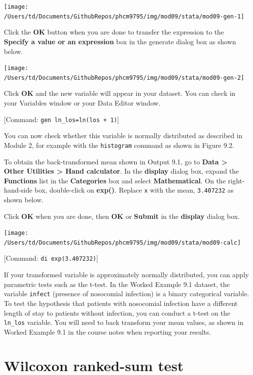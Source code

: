 \documentclass[
]{memoir}
\begin{document}
\texttt{[image: /Users/td/Documents/GithubRepos/phcm9795/img/mod09/stata/mod09-gen-1]}

Click the \textbf{OK} button when you are done to transfer the expression to the \textbf{Specify a value or an expression} box in the generate dialog box as shown below.

\texttt{[image: /Users/td/Documents/GithubRepos/phcm9795/img/mod09/stata/mod09-gen-2]}

Click \textbf{OK} and the new variable will appear in your dataset. You can check in your Variables window or your Data Editor window.

{[}Command: \texttt{gen\ ln\_los=ln(los\ +\ 1)}{]}

You can now check whether this variable is normally distributed as described in Module 2, for example with the \texttt{histogram} command as shown in Figure 9.2.

To obtain the back-transformed mean shown in Output 9.1, go to \textbf{Data \textgreater{} Other Utilities \textgreater{} Hand calculator}. In the \textbf{display} dialog box, expand the \textbf{Functions} list in the \textbf{Categories} box and select \textbf{Mathematical}. On the right-hand-side box, double-click on \textbf{exp()}. Replace \texttt{x} with the mean, \texttt{3.407232} as shown below.

Click \textbf{OK} when you are done, then \textbf{OK} or \textbf{Submit} in the \textbf{display} dialog box.

\texttt{[image: /Users/td/Documents/GithubRepos/phcm9795/img/mod09/stata/mod09-calc]}

{[}Command: \texttt{di\ exp(3.407232)}{]}

If your transformed variable is approximately normally distributed, you can apply parametric tests such as the t-test. In the Worked Example 9.1 dataset, the variable \texttt{infect} (presence of nosocomial infection) is a binary categorical variable. To test the hypothesis that patients with nosocomial infection have a different length of stay to patients without infection, you can conduct a t-test on the \texttt{ln\_los} variable. You will need to back transform your mean values, as shown in Worked Example 9.1 in the course notes when reporting your results.

\hypertarget{wilcoxon-ranked-sum-test}{%
\section{Wilcoxon ranked-sum test}\label{wilcoxon-ranked-sum-test}}
\end{document}
